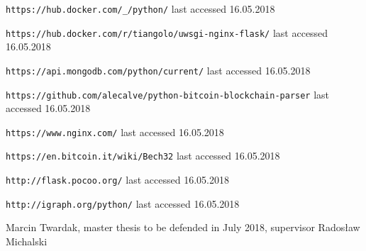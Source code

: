 \documentclass[12pt, en, eng, oneside, final]{mgr}
\begin{document}
\begin{thebibliography}{9}
\texttt{https://hub.docker.com/\_/python/} last accessed 16.05.2018

\texttt{https://hub.docker.com/r/tiangolo/uwsgi-nginx-flask/} last accessed 16.05.2018

\texttt{https://api.mongodb.com/python/current/} last accessed 16.05.2018

\texttt{https://github.com/alecalve/python-bitcoin-blockchain-parser} last accessed 16.05.2018 

\texttt{https://www.nginx.com/} last accessed 16.05.2018

\texttt{https://en.bitcoin.it/wiki/Bech32} last accessed 16.05.2018

\texttt{http://flask.pocoo.org/} last accessed 16.05.2018

\texttt{http://igraph.org/python/} last accessed 16.05.2018

Marcin Twardak, master thesis to be defended in July 2018, supervisor Radosław Michalski


\end{thebibliography}
\end{document}
